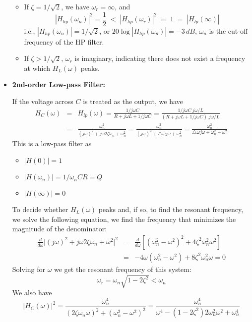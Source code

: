 \documentclass{article}
\begin{document}
\begin{itemize}
\begin{itemize}
  \item If $\zeta=1/\sqrt{2}$, we have $\omega_r=\infty$, and
    \begin{equation}
      |H_{hp}(\omega_n)|^2=\frac{1}{2}\;<\; |H_{hp}(\omega_r)|^2\;=\;1
      \;=\;|H_{lp}(\infty)|
    \end{equation}
    i.e., $|H_{hp}(\omega_n)|=1/\sqrt{2}$, or $20\log |H_{hp}(\omega_n)|=-3\,dB$,
    $\omega_n$ is the cut-off frequency of the HP filter.
  \item If $\zeta>1/\sqrt{2}$, $\omega_r$ is imaginary, indicating
    there does not exist a frequency at which $H_L(\omega)$ peaks. 
  \end{itemize}

\item {\bf 2nd-order Low-pass Filter:}

  If the voltage across $C$ is treated as the output, we have
  \begin{eqnarray}
    H_C(\omega)&=&H_{lp}(\omega)=\frac{1/j\omega C}{R+j\omega L+1/j\omega C}
    =\frac{1/j\omega C\;j\omega/L}{(R+j\omega L+1/j\omega C)\;j\omega/L}
    \nonumber\\
    &=&\frac{\omega_n^2}{(j\omega)^2+j\omega 2\zeta \omega_n+\omega_n^2} 
    =\frac{\omega_n^2}{(j\omega)^2+\triangle \omega j\omega+\omega_n^2}
    =\frac{\omega_n^2}{\triangle \omega j\omega+\omega_n^2-\omega^2}
  \end{eqnarray}
  This is a low-pass filter as
  \begin{itemize}
  \item $|H(0)|=1$
  \item $|H(\omega_n)|=1/\omega_nCR=Q$
  \item $|H(\infty)|=0$
  \end{itemize}
  To decide whether $H_L(\omega)$ peaks and, if so, to find the resonant
  frequency, we solve the following equation, we find the frequency that
  minimizes the magnitude of the denominator: 
  \begin{eqnarray}
    \frac{d}{d\omega}\bigg|(j\omega)^2+j\omega 2\zeta\omega_n+\omega^2\bigg|^2
    &=&\frac{d}{d\omega} [(\omega_n^2-\omega^2)^2+4\zeta^2\omega_n^2\omega^2]
    \nonumber\\
    &=&-4\omega(\omega_n^2-\omega^2)+8\zeta^2\omega_n^2\omega=0
  \end{eqnarray}
  Solving for $\omega$ we get the resonant frequency of this system:
  \begin{equation}
    \omega_r=\omega_n\sqrt{1-2\zeta^2}<\omega_n
  \end{equation}
  We also have
  \begin{equation}
    |H_C(\omega)|^2=\frac{\omega_n^4}{(2\zeta\omega_n\omega)^2+(\omega_n^2-\omega^2)^2}
    =\frac{\omega_n^4}{\omega^4-(1-2\zeta^2)2\omega_n^2\omega^2+\omega_n^4}
  \end{equation}


\end{itemize}
\end{document}

